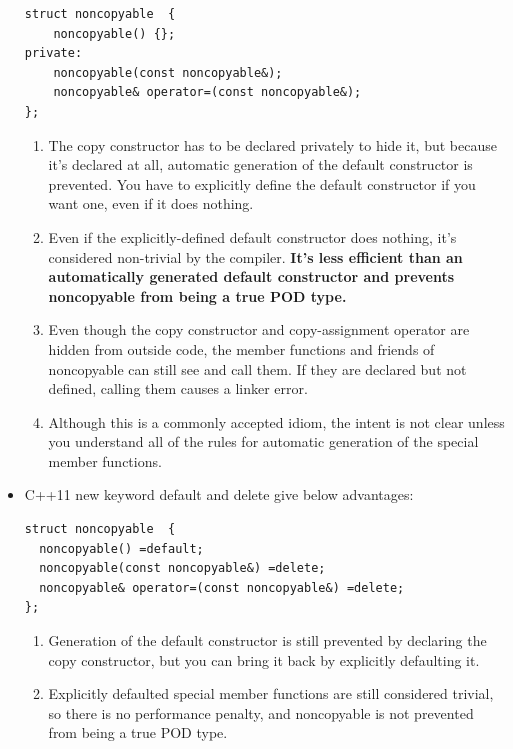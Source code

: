 \documentclass[a4paper,11pt,twoside]{book}
\begin{document}
\begin{itemize}
\begin{lstlisting}[numbers=none]
struct noncopyable  {
	noncopyable() {};
private:
	noncopyable(const noncopyable&);
	noncopyable& operator=(const noncopyable&);
};
\end{lstlisting}
\begin{enumerate}
	\item The copy constructor has to be declared privately to hide it, but because it's declared at all, automatic generation of the default constructor is prevented. You have to explicitly define the default constructor if you want one, even if it does nothing.

	\item Even if the explicitly-defined default constructor does nothing, it's considered non-trivial by the compiler. \textbf{It's less efficient than an automatically generated default constructor and prevents noncopyable from being a true POD type.}

	\item Even though the copy constructor and copy-assignment operator are hidden from outside code, the member functions and friends of noncopyable can still see and call them. If they are declared but not defined, calling them causes a linker error.

	\item Although this is a commonly accepted idiom, the intent is not clear unless you understand all of the rules for automatic generation of the special member functions.
\end{enumerate}

	\item C++11 new keyword default and delete give below advantages:
\begin{lstlisting}[numbers=none]
struct noncopyable  {
  noncopyable() =default;
  noncopyable(const noncopyable&) =delete;
  noncopyable& operator=(const noncopyable&) =delete;
};
\end{lstlisting}

\begin{enumerate}
	\item Generation of the default constructor is still prevented by declaring the copy constructor, but you can bring it back by explicitly defaulting it.

	\item Explicitly defaulted special member functions are still considered trivial, so there is no performance penalty, and noncopyable is not prevented from being a true POD type.


\end{enumerate}
\end{itemize}
\end{document}
